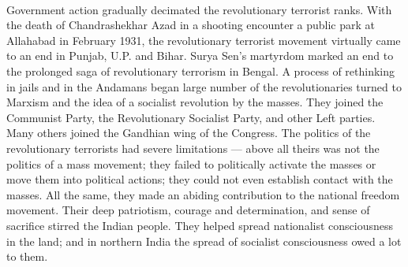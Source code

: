 \begin{multicols}{2}
\paragraph*{}
Government action gradually decimated the revolutionary terrorist ranks. With the death of Chandrashekhar Azad in a shooting encounter a public park at Allahabad in February 1931, the revolutionary terrorist movement virtually came to an end in Punjab, U.P. and Bihar. Surya Sen's martyrdom marked an end to the prolonged saga of revolutionary terrorism in Bengal. A process of rethinking in jails and in the Andamans began large number of the revolutionaries turned to Marxism and the idea of a socialist revolution by the masses. They joined the Communist Party, the Revolutionary Socialist Party, and other Left parties. Many others joined the Gandhian wing of the Congress. The politics of the revolutionary terrorists had severe limitations --- above all theirs was not the politics of a mass movement; they failed to politically activate the masses or move them into political actions; they could not even establish contact with the masses. All the same, they made an abiding contribution to the national freedom movement. Their deep patriotism, courage and determination, and sense of sacrifice stirred the Indian people. They helped spread nationalist consciousness in the land; and in northern India the spread of socialist consciousness owed a lot to them.

\end{multicols}
